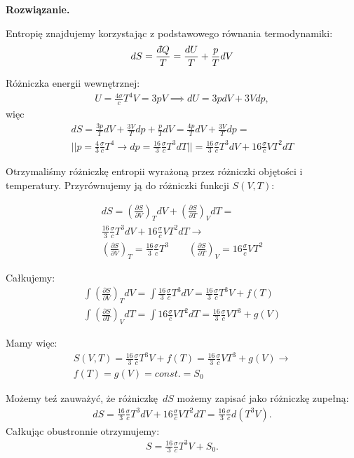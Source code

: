 \documentclass[11pt,a4paper]{article}
\newcommand{\dbar} {\ensuremath{\,\mathchar'26\mkern-12mu d}}
\newcommand{\Partial}[3]{\left( \frac{\partial #1}{\partial #2} \right)_{#3}}
\newenvironment{solution}{\vspace{1cm} \par\textbf{Rozwiązanie.} \vspace{1cm}}{}
\begin{document}
\begin{solution}

Entropię znajdujemy korzystając z podstawowego równania termodynamiki:
\begin{align*}
dS = \frac{\dbar Q}{T} = \frac{dU}{T} + \frac{p}{T} dV
\end{align*}

Różniczka energii wewnętrznej:
\begin{align*}
  U = \frac{4\sigma}{c} T^4 V  = 3pV \implies
	dU = 3p dV + 3 V dp,
\end{align*}
więc
\begin{align*}
	dS = \frac{3p}{T} dV + \frac{3 V}{T} dp  + \frac{p}{T} dV =
  \frac{4p}{T} dV + \frac{3 V}{T} dp = \\
  || p =  \frac{4}{3} \frac{\sigma}{c} T^4  \to dp = \frac{16}{3} \frac{\sigma}{c} T^3 dT || =
  \frac{16}{3} \frac{\sigma}{c} T^3 dV + 16 \frac{\sigma }{c} V T^2 dT
\end{align*}

Otrzymaliśmy różniczkę entropii wyrażoną przez różniczki objętości i temperatury.
Przyrównujemy ją do różniczki funkcji $S(V,T)$:

\begin{align*}
    dS = \Partial{S}{V}{T} dV + \Partial{S}{T}{V} dT = \\
    \frac{16}{3} \frac{\sigma}{c} T^3 dV + 16 \frac{\sigma }{c} V T^2 dT \to \\
    \Partial{S}{V}{T}=\frac{16}{3} \frac{\sigma}{c}T^3 \qquad \Partial{S}{T}{V}=
    16 \frac{\sigma}{c}V T^2
\end{align*}

Całkujemy:
\begin{align*}
  \int \Partial{S}{V}{T} dV = \int \frac{16}{3} \frac{\sigma}{c} T^3 dV  = \frac{16}{3} \frac{\sigma}{c} T^3 V + f(T) \\
  \int \Partial{S}{T}{V} dT = \int 16 \frac{\sigma}{c} V T^2 dT  = \frac{16}{3} \frac{\sigma}{c} V T^3 + g(V)
\end{align*}

Mamy więc:
\begin{align*}
  S(V,T) = \frac{16}{3} \frac{\sigma}{c} T^3 V + f(T) = \frac{16}{3} \frac{\sigma}{c} V T^3 + g(V) \to \\
  f(T) = g(V) = const. = S_0
\end{align*}


Możemy teź zauważyć, że różniczkę $dS$ możemy zapisać jako różniczkę zupełną:
\begin{align*}
	dS = \frac{16}{3} \frac{\sigma}{c} T^3 dV + 16 \frac{\sigma }{c} V T^2 dT = 
  \frac{16}{3} \frac{\sigma }{c}   d \left(T^3 V\right).
\end{align*}
Całkując obustronnie otrzymujemy:
\begin{align*}
	S = \frac{16}{3} \frac{\sigma }{c} T^3 V + S_0.
\end{align*}


\end{solution}
\end{document}
